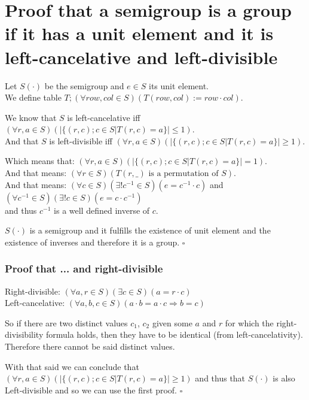 \documentclass[11pt]{article}
\begin{document}
    \part*{Proof that a semigroup is a group if it has a unit element and it is left-cancelative and left-divisible}
    
    Let $S(\cdot)$ be the semigroup and $e \in S$ its unit element. \\
    We define table $T; (\forall row, col \in S)(T(row, col) := row \cdot col)$.

    We know that $S$ is left-cancelative iff $(\forall r, a \in S)(|\{(r, c); c \in S | T(r, c) = a\}| \le 1)$. \\
    And that $S$ is left-divisible iff $(\forall r, a \in S)(|\{(r, c); c \in S | T(r, c) = a\}| \ge 1)$.

    Which means that: $(\forall r, a \in S)(|\{(r, c); c \in S | T(r, c) = a\}| = 1)$. \\
    And that means: $(\forall r \in S)(T(r, \_) \text{ is a permutation of } S)$. \\
    And that means: $(\forall c \in S)(\exists !c^{-1} \in S)(e = c^{-1} \cdot c)$ and $(\forall c^{-1} \in S)(\exists !c \in S)(e = c \cdot c^{-1})$ \\
    and thus $c^{-1}$ is a well defined inverse of $c$.

    $S(\cdot)$ is a semigroup and it fulfills the existence of unit element and the existence of inverses and therefore it is a group. $\square$

    \section*{Proof that ... and right-divisible}

    Right-divisible: $(\forall a, r \in S)(\exists c \in S)(a = r \cdot c)$ \\
    Left-cancelative: $(\forall a, b, c \in S)(a \cdot b = a \cdot c \Rightarrow b = c)$

    So if there are two distinct values $c_1$, $c_2$ given some $a$ and $r$ for which the right-divisibility formula holds, then they have to be identical (from left-cancelativity). Therefore there cannot be said distinct values.

    With that said we can conclude that $(\forall r, a \in S)(|\{(r, c); c \in S | T(r, c) = a\}| \ge 1)$ and thus that $S(\cdot)$ is also Left-divisible and so we can use the first proof. $\square$

    \pagebreak
\end{document}
